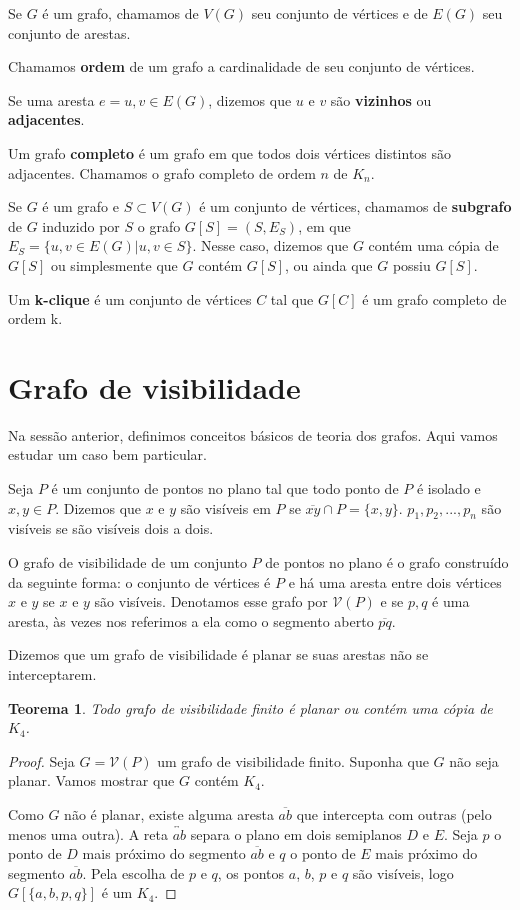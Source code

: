 \documentclass[a4paper]{book}
\newtheorem{teorema}{Teorema}[section]
\begin{document}
Se $G$ é um grafo, chamamos de $V(G)$ seu conjunto de vértices e de $E(G)$ seu conjunto de arestas.

Chamamos \textbf{ordem} de um grafo a cardinalidade de seu conjunto de vértices.

Se uma aresta $e={u,v}\in E(G)$, dizemos que $u$ e $v$ são \textbf{vizinhos} ou \textbf{adjacentes}.

Um grafo \textbf{completo} é um grafo em que todos dois vértices distintos são adjacentes. Chamamos o grafo completo de ordem $n$ de $K_n$.

Se $G$ é um grafo e  $S\subset V(G)$ é um conjunto de vértices, chamamos de \textbf{subgrafo} de $G$ induzido por $S$ o grafo $G[S]=(S,E_S)$, em que $E_S=\{{u,v}\in E(G)|u,v\in S\}$. Nesse caso, dizemos que $G$ contém uma cópia de $G[S]$ ou simplesmente que $G$ contém $G[S]$, ou ainda que $G$ possiu $G[S]$.

Um \textbf{k-clique} é um conjunto de vértices $C$ tal que $G[C]$ é um grafo completo de ordem k.

\section{Grafo de visibilidade}
Na sessão anterior, definimos conceitos básicos de teoria dos grafos. Aqui vamos estudar um caso bem particular.

Seja $P$ é um conjunto de pontos no plano tal que todo ponto de $P$ é isolado e $x,y\in P$. Dizemos que $x$ e $y$ são visíveis em $P$ se $\overline{xy}\cap P =\{x,y\}$. $p_1, p_2, ..., p_n$ são visíveis se são visíveis dois a dois.

O grafo de visibilidade de um conjunto $P$ de pontos no plano é o grafo construído da seguinte forma: o conjunto de vértices é $P$ e há uma aresta entre dois vértices $x$ e $y$ se $x$ e $y$ são visíveis. Denotamos esse grafo por $\mathcal V(P)$ e se ${p,q}$ é uma aresta, às vezes nos referimos a ela como o segmento aberto $\overline{pq}$.

Dizemos que um grafo de visibilidade é planar se suas arestas não se interceptarem.

\begin{teorema}\cite{visibility}\label{planork4}
    Todo grafo de visibilidade finito é planar ou contém uma cópia de $K_4$.
\end{teorema}
\begin{proof}
    Seja $G=\mathcal V(P)$ um grafo de visibilidade finito. Suponha que $G$ não seja planar. Vamos mostrar que $G$ contém $K_4$.

    Como $G$ não é planar, existe alguma aresta $\overline{ab}$ que intercepta com outras (pelo menos uma outra). A reta $\overleftrightarrow{ab}$ separa o plano em dois semiplanos $D$ e $E$. Seja $p$ o ponto de $D$ mais próximo do segmento $\overline{ab}$ e $q$ o ponto de $E$ mais próximo do segmento $\overline{ab}$. Pela escolha de $p$ e $q$, os pontos $a$, $b$, $p$ e $q$ são visíveis, logo $G[\{a,b,p,q\}]$ é um $K_4$.
\end{proof}
\end{document}
